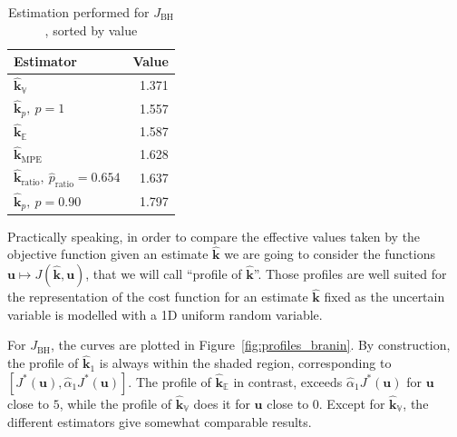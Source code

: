 \documentclass[preprint, 1p]{elsarticle}
\newcommand{\Ex}{\mathbb{E}}
\newcommand{\hatkmean}{\hat{\mathbf{k}}_{\Ex}}
\newcommand{\hatkvar}{\hat{\mathbf{k}}_{\mathbb{V}}}
\newcommand{\hatkmpe}{\hat{\mathbf{k}}_{\mathrm{MPE}}}
\newcommand{\kest}{\hat{\mathbf{k}}}
\newcommand{\checka}{{\alpha}}
\newcommand{\checkk}{\mathbf{k}}
\begin{document}
\begin{table}[!h]
  \centering
\caption{Estimation performed for $J_{\mathrm{BH}}$, sorted by value}
\begin{tabular}{lr}
  \toprule
Estimator & Value \\ \midrule
$\hatkvar$ & 1.371 \\ 
$\kest_{p},~p=1$ & 1.557 \\ 
$\hatkmean$ & 1.587 \\ 
$\kest_{\mathrm{MPE}}$ & 1.628 \\ 
$\kest_{\mathrm{ratio}},~\hat{p}_{\mathrm{ratio}}=0.654$ & 1.637 \\ 
$\kest_p,~p=0.90$ & 1.797 \\  \bottomrule
\end{tabular}
\label{tab:recap_estimates_branin}
\end{table}
Practically speaking, in order to compare the effective values taken by the objective function given an estimate $\kest$ we are going to consider the functions $\mathbf{u} \mapsto J(\kest,\mathbf{u})$, that we will call ``profile of $\kest$''. Those profiles are well suited for the representation of the cost function for an estimate $\kest$ fixed as the uncertain variable is modelled with a 1D uniform random variable.

For $J_{\mathrm{BH}}$, the curves are plotted in Figure~\ref{fig:profiles_branin}. By construction, the profile of $\hat{\checkk}_1$ is always within the shaded region, corresponding to $[J^*(\mathbf{u}), \hat{\checka}_1 J^*(\mathbf{u})]$. The profile of $\hatkmean$ in contrast, exceeds $\hat{\checka}_1 J^*(\mathbf{u})$ for $\mathbf{u}$ close to $5$, while the profile of $\hatkvar$ does it for $\mathbf{u}$ close to $0$. Except for $\hatkvar$, the different estimators give somewhat comparable results.
\end{document}
